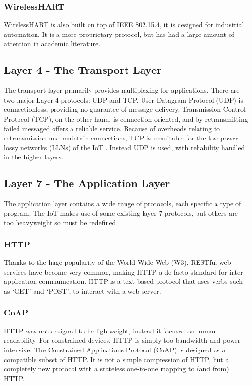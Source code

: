 \documentclass[10pt,journal,compsoc]{IEEEtran}
\begin{document}
\subsubsection{WirelessHART}
WirelessHART is also built on top of IEEE 802.15.4, it is designed for
industrial automation. It is a more proprietary protocol, but has had a large
amount of attention in academic literature.  

\subsection{Layer 4 - The Transport Layer}
The transport layer primarily provides multiplexing for applications. There are
two major Layer 4 protocols:  UDP and TCP. User Datagram Protocol (UDP) is
connectionless, providing no guarantee of message delivery.  Transmission
Control Protocol (TCP), on the other hand, is connection-oriented, and by
retransmitting failed messaged offers a reliable service. Because of overheads
relating to retransmission and maintain connections, TCP is unsuitable for the
low power lossy networks (LLNs) of the IoT \cite{embedded}. Instead UDP is
used, with reliability handled in the higher layers.

\subsection{Layer 7 - The Application Layer}
The application layer contains a wide range of protocols, each specific a type
of program. The IoT  makes use of some existing layer 7 protocols, but others
are too heavyweight so must be redefined. 

\subsubsection{HTTP} 
Thanks to the huge popularity of the World Wide Web (W3), RESTful web services
have become very common, making HTTP a de facto standard for inter-application
communication. HTTP is a text based protocol that uses verbs such as `GET' and
`POST', to interact with a web server.  

\subsubsection{CoAP}
HTTP was not designed to be lightweight, instead it focused on human
readability. For constrained devices, HTTP is simply too bandwidth and power
intensive. The Constrained Applications Protocol (CoAP) is designed as a
compatible subset of HTTP. It is not a simple compression of HTTP, but a
completely new protocol with a stateless one-to-one mapping to (and from) HTTP. 
\end{document}
